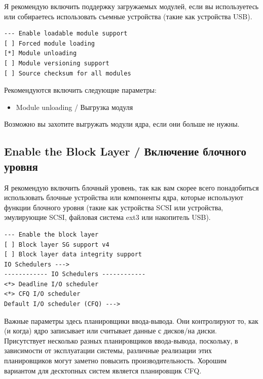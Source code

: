 \documentclass[10pt]{book}
\begin{document}
Я рекомендую включить поддержку загружаемых модулей, если вы используетесь или собираетесь использовать съемные устройства (такие как устройства USB).

\vspace{3mm}
\begin{tcolorbox}[colback=gray!14!white, colframe=blue!75!blue]
\begin{lstlisting}
--- Enable loadable module support
[ ] Forced module loading
[*] Module unloading
[ ] Module versioning support
[ ] Source checksum for all modules
\end{lstlisting}
\end{tcolorbox}

Рекомендуются включить следующие параметры:
\begin{itemize}
\item Module unloading / Выгрузка модуля 
\end{itemize}

Возможно вы захотите выгружать модули ядра, если они больше не нужны.

\subsection {Enable the Block Layer / Включение блочного уровня}

Я рекомендую включить блочный уровень, так как вам скорее всего понадобиться использовать блочные устройства или компоненты ядра, которые используют функции блочного уровня (такие как устройства SCSI или устройства, эмулирующие SCSI, файловая система ext3 или накопитель USB).

\vspace{3mm}
\begin{tcolorbox}[colback=gray!14!white, colframe=blue!75!blue]
\begin{lstlisting}
--- Enable the block layer
[ ] Block layer SG support v4
[ ] Block layer data integrity support
IO Schedulers --->
------------ IO Schedulers ------------
<*> Deadline I/O scheduler
<*> CFQ I/O scheduler
Default I/O scheduler (CFQ) --->
\end{lstlisting}
\end{tcolorbox}

Важные параметры здесь планировщики ввода-вывода. Они контролируют то, как (и когда) ядро записывает или считывает данные с дисков/на диски. Присутствует несколько разных планировщиков ввода-вывода, поскольку, в зависимости от эксплуатации системы, различные реализации этих планировщиков могут заметно повысить производительность. Хорошим вариантом для десктопных систем является планировщик CFQ.
\end{document}
